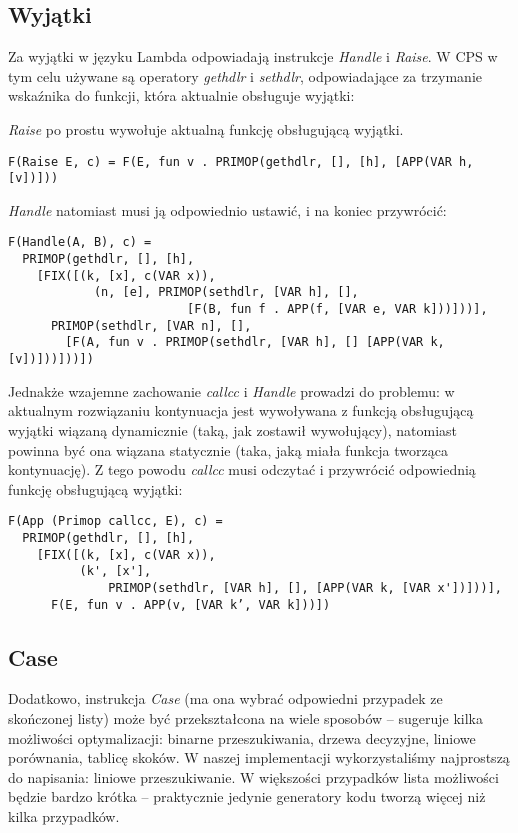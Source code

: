 \documentclass[11pt]{scrartcl}
\begin{document}
\subsection{Wyjątki}
Za wyjątki w języku  Lambda odpowiadają instrukcje \textit{Handle} i \textit{Raise}. W CPS w tym
celu używane są operatory \textit{gethdlr} i \textit{sethdlr}, odpowiadające za trzymanie
wskaźnika do funkcji, która aktualnie obsługuje wyjątki:

\textit{Raise} po prostu wywołuje aktualną funkcję obsługującą wyjątki.
\begin{lstlisting}
F(Raise E, c) = F(E, fun v . PRIMOP(gethdlr, [], [h], [APP(VAR h, [v])]))
\end{lstlisting}

\textit{Handle} natomiast musi ją odpowiednio ustawić, i na koniec przywrócić:
\begin{lstlisting}
F(Handle(A, B), c) =
  PRIMOP(gethdlr, [], [h],
    [FIX([(k, [x], c(VAR x)),
            (n, [e], PRIMOP(sethdlr, [VAR h], [],
                         [F(B, fun f . APP(f, [VAR e, VAR k]))]))],
      PRIMOP(sethdlr, [VAR n], [],
        [F(A, fun v . PRIMOP(sethdlr, [VAR h], [] [APP(VAR k, [v])]))]))])
\end{lstlisting}

Jednakże wzajemne zachowanie \textit{callcc} i \textit{Handle} prowadzi do problemu: w aktualnym rozwiązaniu
kontynuacja jest wywoływana z funkcją obsługującą wyjątki wiązaną dynamicznie
(taką, jak zostawił wywołujący), natomiast powinna być ona wiązana statycznie
(taka, jaką miała funkcja tworząca kontynuację). Z tego powodu \textit{callcc} musi
odczytać i przywrócić odpowiednią funkcję obsługującą wyjątki:
\begin{lstlisting}
F(App (Primop callcc, E), c) =
  PRIMOP(gethdlr, [], [h],
    [FIX([(k, [x], c(VAR x)),
          (k', [x'], 
              PRIMOP(sethdlr, [VAR h], [], [APP(VAR k, [VAR x'])]))],
      F(E, fun v . APP(v, [VAR k’, VAR k]))])
\end{lstlisting}

\subsection{Case}
Dodatkowo, instrukcja \textit{Case} (ma ona
wybrać odpowiedni przypadek ze skończonej listy) może być przekształcona na
wiele sposobów  -- \cite[Chapter 5.7: Case statements]{Appel} sugeruje kilka
możliwości optymalizacji: binarne przeszukiwania, drzewa decyzyjne, liniowe
porównania, tablicę skoków. W naszej implementacji wykorzystaliśmy najprostszą
do napisania: liniowe przeszukiwanie. W większości przypadków lista możliwości
będzie bardzo krótka -- praktycznie jedynie generatory kodu tworzą więcej niż
kilka przypadków.
\end{document}
